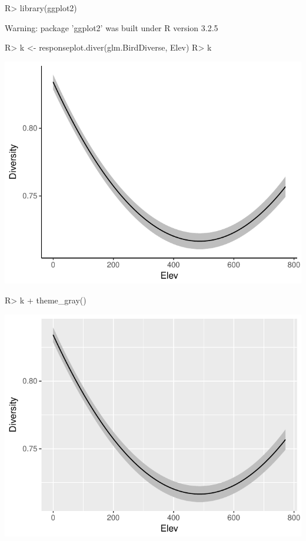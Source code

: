 \documentclass[article]{jss}
\begin{document}
\begin{CodeChunk}

\begin{CodeInput}
R> library(ggplot2)
\end{CodeInput}

\begin{CodeOutput}
Warning: package 'ggplot2' was built under R version 3.2.5
\end{CodeOutput}

\begin{CodeInput}
R> k <- responseplot.diver(glm.BirdDiverse, Elev)
R> k
\end{CodeInput}


\begin{center}\includegraphics{diversityocc_files/figure-latex/unnamed-chunk-26-1} \end{center}


\begin{CodeInput}
R> k + theme_gray()
\end{CodeInput}


\begin{center}\includegraphics{diversityocc_files/figure-latex/unnamed-chunk-26-2} \end{center}



\end{CodeChunk}
\end{document}
